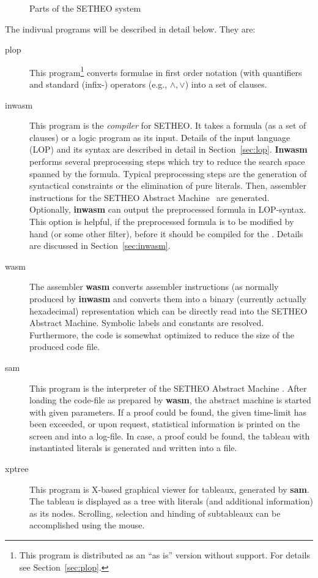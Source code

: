 \begin{figure}[htb]
\caption{Parts of the SETHEO system}
\label{fig.1}
\end{figure}

The indivual programs will be described in detail below. They are:

\begin{description}
\item[plop]
This program\footnote{This program is distributed as an ``as is'' version
without support. For details see Section~\ref{sec:plop}.} converts
formulae in first order notation (with quantifiers and standard
(infix-) operators (e.g., $\wedge, \vee$) into a set of clauses.
\item[inwasm]
This program is the {\em compiler\/} for SETHEO. It takes a formula
(as a set of clauses) or a logic program as its input. Details of the
input language (LOP) and its syntax are described in detail in
Section~\ref{sec:lop}.
{\bf Inwasm} performs several preprocessing steps which try
to reduce the search space spanned by the formula. Typical preprocessing
steps are the generation of syntactical constraints or the elimination
of pure literals.
Then, assembler instructions for the SETHEO Abstract Machine \SAM\ 
are generated. Optionally, {\bf inwasm} can output 
the preprocessed formula in LOP-syntax.
This option is helpful, if the preprocessed formula is to be
modified by hand (or some other filter), before it should be compiled
for the \SAM.
Details are discussed in Section~\ref{sec:inwasm}.
\item[wasm]
The assembler {\bf wasm} converts assembler instructions (as normally
produced by {\bf inwasm} and converts them into a binary
(currently actually hexadecimal) representation which can be directly
read into the SETHEO Abstract Machine.
Symbolic labels and constants are resolved. Furthermore, the
code is somewhat optimized to reduce the size of the produced code file.

\item[sam]
This program is the interpreter of the SETHEO Abstract Machine
\SAM. After loading the code-file as prepared by {\bf wasm}, the
abstract machine is started with given parameters.
If a proof could be found, the given time-limit has been exceeded,
or upon request, statistical information is printed on the screen
and into a log-file. In case, a proof could be found, the tableau
with instantiated literals is generated and written into a file.

\item[xptree]
This program is X-based graphical viewer for tableaux, generated
by {\bf sam}. The tableau is displayed as a tree with literals
(and additional information) as its nodes. Scrolling, selection and
hinding of subtableaux can be accomplished using the mouse.
\end{description}

